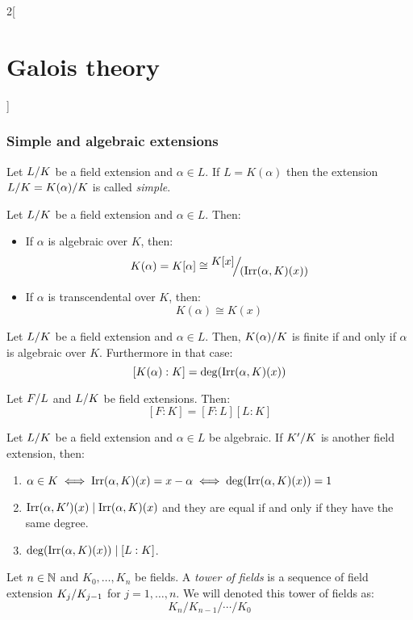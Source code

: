 \documentclass[../../../main.tex]{subfiles}
\begin{document}
\begin{multicols}{2}[\section{Galois theory}]
  \subsubsection*{Simple and algebraic extensions}
  \begin{definition}
    Let $\quot{L}{K}$ be a field extension and $\alpha\in L$. If $L=K(\alpha)$ then the extension $\quot{L}{K}=\quot{K(\alpha)}{K}$ is called \textit{simple}.
  \end{definition}
  \begin{prop}
    Let $\quot{L}{K}$ be a field extension and $\alpha\in L$. Then:
    \begin{itemize}
      \item If $\alpha$ is algebraic over $K$, then: $$K(\alpha)=K[\alpha]\cong\quot{K[x]}{(\irr(\alpha,K)(x))}$$
      \item If $\alpha$ is transcendental over $K$, then: $$K(\alpha)\cong K(x)$$
    \end{itemize}
  \end{prop}
  \begin{corollary}
    Let $\quot{L}{K}$ be a field extension and $\alpha\in L$. Then, $\quot{K(\alpha)}{K}$ is finite if and only if $\alpha$ is algebraic over $K$. Furthermore in that case: $$[K(\alpha):K]=\deg(\operatorname{Irr}(\alpha,K)(x))$$
  \end{corollary}
  \begin{theorem}
    Let $\quot{F}{L}$ and $\quot{L}{K}$ be field extensions. Then: $$[F:K]=[F:L][L:K]$$
  \end{theorem}
  \begin{prop}
    Let $\quot{L}{K}$ be a field extension and $\alpha\in L$ be algebraic. If $\quot{K'}{K}$ is another field extension, then:
    \begin{enumerate}
      \item $\alpha\in K\iff\operatorname{Irr}(\alpha,K)(x)=x-\alpha\iff \deg(\operatorname{Irr}(\alpha,K)(x))=1$
      \item $\operatorname{Irr}(\alpha,K')(x)\mid\operatorname{Irr}(\alpha,K)(x)$ and they are equal if and only if they have the same degree.
      \item $\deg(\operatorname{Irr}(\alpha,K)(x))\mid [L:K]$.
    \end{enumerate}
  \end{prop}
  \begin{definition}
    Let $n\in\mathbb{N}$ and $K_0,\ldots,K_n$ be fields. A \textit{tower of fields} is a sequence of field extension $\quot{K_j}{K_{j-1}}$ for $j=1,\ldots,n$. We will denoted this tower of fields as: $$K_n/K_{n-1}/\cdots/K_0$$

\end{definition}
\end{multicols}
\end{document}
